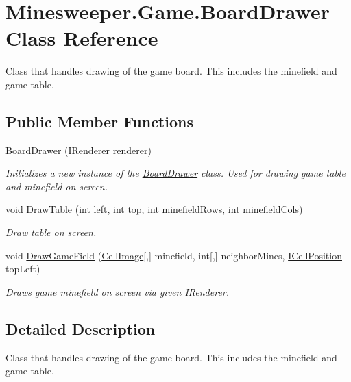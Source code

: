 \hypertarget{class_minesweeper_1_1_game_1_1_board_drawer}{\section{Minesweeper.\+Game.\+Board\+Drawer Class Reference}
\label{class_minesweeper_1_1_game_1_1_board_drawer}
}


Class that handles drawing of the game board. This includes the minefield and game table.  


\subsection*{Public Member Functions}
\begin{DoxyCompactItemize}
\item 
\hyperlink{class_minesweeper_1_1_game_1_1_board_drawer_a5aa279b32bb1d832302ff2b59acc07b2}{Board\+Drawer} (\hyperlink{interface_minesweeper_1_1_lib_1_1_i_renderer}{I\+Renderer} renderer)
\begin{DoxyCompactList}\small\item\em Initializes a new instance of the \hyperlink{class_minesweeper_1_1_game_1_1_board_drawer}{Board\+Drawer} class. Used for drawing game table and minefield on screen. \end{DoxyCompactList}\item 
void \hyperlink{class_minesweeper_1_1_game_1_1_board_drawer_a54c0812622564c13a131ab63f6c06540}{Draw\+Table} (int left, int top, int minefield\+Rows, int minefield\+Cols)
\begin{DoxyCompactList}\small\item\em Draw table on screen. \end{DoxyCompactList}\item 
void \hyperlink{class_minesweeper_1_1_game_1_1_board_drawer_a9fd9a820183f7ab3767451bdc01c0642}{Draw\+Game\+Field} (\hyperlink{namespace_minesweeper_adf92d608047dafd69d16008492d317bd}{Cell\+Image}\mbox{[},\mbox{]} minefield, int\mbox{[},\mbox{]} neighbor\+Mines, \hyperlink{interface_minesweeper_1_1_lib_1_1_i_cell_position}{I\+Cell\+Position} top\+Left)
\begin{DoxyCompactList}\small\item\em Draws game minefield on screen via given I\+Renderer. \end{DoxyCompactList}\end{DoxyCompactItemize}


\subsection{Detailed Description}
Class that handles drawing of the game board. This includes the minefield and game table. 



